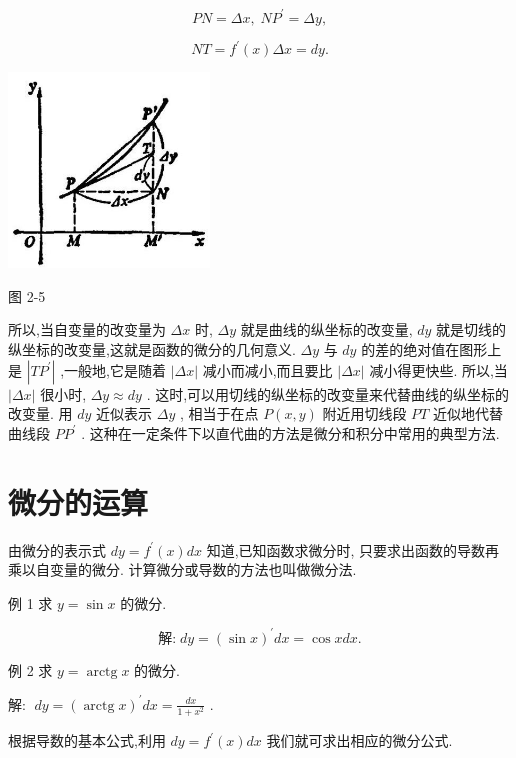 \documentclass[lang=cn,newtx,12pt,scheme=chinese]{elegantbook}
\begin{document}
\[
{PN} = {\Delta x},\;N{P}^{\prime } = {\Delta y},
\]

\[
{NT} = {f}^{\prime }\left( x\right) {\Delta x} = {dy}.
\]

\begin{center}
\includegraphics[max width=0.4\textwidth]{images/01912c18-5c3f-733d-b775-749ba9897a9d_113_880246.jpg}
\end{center}

图 2-5

所以,当自变量的改变量为 \({\Delta x}\) 时, \({\Delta y}\) 就是曲线的纵坐标的改变量, \({dy}\) 就是切线的纵坐标的改变量,这就是函数的微分的几何意义. \({\Delta y}\) 与 \({dy}\) 的差的绝对值在图形上是 \(\left| {T{P}^{\prime }}\right|\) ,一般地,它是随着 \(\left| {\Delta x}\right|\) 减小而减小,而且要比 \(\left| {\Delta x}\right|\) 减小得更快些. 所以,当 \(\left| {\Delta x}\right|\) 很小时, \({\Delta y} \approx {dy}\) . 这时,可以用切线的纵坐标的改变量来代替曲线的纵坐标的改变量. 用 \({dy}\) 近似表示 \({\Delta y}\) , 相当于在点 \(P\left( {x,y}\right)\) 附近用切线段 \({PT}\) 近似地代替曲线段 \(P{P}^{\prime }\) . 这种在一定条件下以直代曲的方法是微分和积分中常用的典型方法.

\section{微分的运算}

由微分的表示式 \({dy} = {f}^{\prime }\left( x\right) {dx}\) 知道,已知函数求微分时, 只要求出函数的导数再乘以自变量的微分. 计算微分或导数的方法也叫做微分法.

例 1 求 \(y = \sin x\) 的微分.

\[
\text{解:}\;{dy} = {\left( \sin x\right) }^{\prime }{dx} = \cos {xdx}\text{.}
\]

例 2 求 \(y = \operatorname{arctg}x\) 的微分.

解: \(\;{dy} = {\left( \operatorname{arctg}x\right) }^{\prime }{dx} = \frac{dx}{1 + {x}^{2}}\) .

根据导数的基本公式,利用 \({dy} = {f}^{\prime }\left( x\right) {dx}\) 我们就可求出相应的微分公式.
\end{document}
